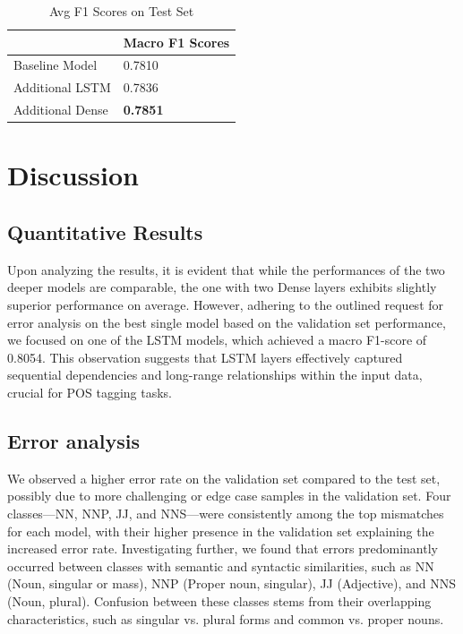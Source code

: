 \documentclass[11pt]{article}
\begin{document}
\begin{table}[ht]
\footnotesize
\caption{Avg F1 Scores on Test Set}
\centering
\begin{tabular}{|l|l|}
\hline
                             & Macro F1 Scores \\ \hline
Baseline Model                     & 0.7810                   \\ \hline
Additional LSTM                    & 0.7836                  \\ \hline
Additional Dense                  &  \textbf{0.7851}                   \\ \hline
\end{tabular}
\label{Tab:Tcr_2}
\end{table}


\section{Discussion}
\label{sec:discussion}
\subsection{Quantitative Results}
Upon analyzing the results, it is evident that while the performances of the two deeper models are comparable, the one with two Dense layers exhibits slightly superior performance on average. However, adhering to the outlined request for error analysis on the best single model based on the validation set performance, we focused on one of the LSTM models, which achieved a macro F1-score of 0.8054. This observation suggests that LSTM layers effectively captured sequential dependencies and long-range relationships within the input data, crucial for POS tagging tasks.

\subsection{Error analysis}
We observed a higher error rate on the validation set compared to the test set, possibly due to more challenging or edge case samples in the validation set. Four classes—NN, NNP, JJ, and NNS—were consistently among the top mismatches for each model, with their higher presence in the validation set explaining the increased error rate.
Investigating further, we found that errors predominantly occurred between classes with semantic and syntactic similarities, such as NN (Noun, singular or mass), NNP (Proper noun, singular), JJ (Adjective), and NNS (Noun, plural). Confusion between these classes stems from their overlapping characteristics, such as singular vs. plural forms and common vs. proper nouns.
\end{document}
